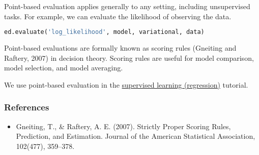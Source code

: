 Point-based evaluation applies generally to any setting, including
unsupervised tasks. For example, we can evaluate the likelihood of
observing the data.
\begin{lstlisting}[language=Python]
ed.evaluate('log_likelihood', model, variational, data)
\end{lstlisting}

Point-based evaluations are formally known as scoring rules (Gneiting
and Raftery, 2007) in decision theory. Scoring rules are
useful for model comparison, model selection, and model averaging.

We use point-based evaluation in the
\href{tut_supervised_regression.html}{supervised learning
(regression)} tutorial.

\subsubsection{References}\label{references}

\begin{itemize}
\item
  Gneiting, T., & Raftery, A. E. (2007). Strictly Proper Scoring
  Rules, Prediction, and Estimation. Journal of the American
  Statistical Association, 102(477), 359–378.
\end{itemize}

